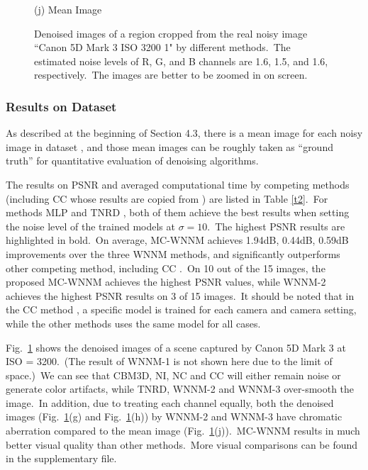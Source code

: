 \documentclass[10pt,twocolumn,letterpaper]{article}
\begin{document}
\begin{figure}
{\begin{minipage}[t]{0.19\textwidth}
{\footnotesize (j) Mean Image}
\end{minipage}
}\vspace{-1mm}
\caption{Denoised images of a region cropped from the real noisy image ``Canon 5D Mark 3 ISO 3200 1" \cite{crosschannel2016} by different methods.\ The estimated noise levels of R, G, and B channels are 1.6, 1.5, and 1.6, respectively.\ The images are better to be zoomed in on screen.}
\vspace{-2mm}
\label{f4}
\end{figure}
\vspace{-2mm}
\subsubsection{Results on Dataset \cite{crosschannel2016}}
\vspace{-2mm}

\quad As described at the beginning of Section 4.3, there is a mean image for each noisy image in dataset \cite{crosschannel2016}, and those mean images can be roughly taken as ``ground truth'' for quantitative evaluation of denoising algorithms.

The results on PSNR and averaged computational time by competing methods (including CC \cite{crosschannel2016} whose results are copied from \cite{crosschannel2016}) are listed in Table \ref{t2}.\ For methods MLP \cite{mlp} and TNRD \cite{chen2015learning}, both of them achieve the best results when setting the noise level of the trained models at $\sigma=10$.\ The highest PSNR results are highlighted in bold.\ On average, MC-WNNM achieves 1.94dB, 0.44dB, 0.59dB improvements over the three WNNM methods, and significantly outperforms other competing method, including CC \cite{crosschannel2016}.\ On 10 out of the 15 images, the proposed MC-WNNM achieves the highest PSNR values, while WNNM-2 achieves the highest PSNR results on 3 of 15 images.\ It should be noted that in the CC method \cite{crosschannel2016}, a specific model is trained for each camera and camera setting, while the other methods uses the same model for all cases. 

Fig.\ \ref{f4} shows the denoised images of a scene captured by Canon 5D Mark 3 at ISO = 3200.\ (The result of WNNM-1 is not shown here due to the limit of space.)\ We can see that CBM3D, NI, NC and CC will either remain noise or generate color artifacts, while TNRD, WNNM-2 and WNNM-3 over-smooth the image.\ In addition, due to treating each channel equally, both the denoised images (Fig.\ \ref{f4}(g) and Fig.\ \ref{f4}(h)) by WNNM-2 and WNNM-3 have chromatic aberration compared to the mean image (Fig.\ \ref{f4}(j)).\ MC-WNNM results in much better visual quality than other methods.\ More visual comparisons can be found in the supplementary file.
\end{document}
